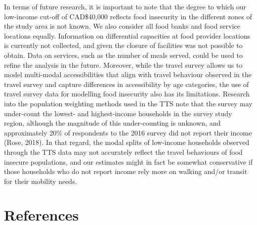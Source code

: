 \documentclass[]{elsarticle} %
\begin{document}
In terms of future research, it is important to note that the degree to
which our low-income cut-off of CAD\$40,000 reflects food insecurity in
the different zones of the study area is not known. We also consider all
food banks and food service locations equally. Information on
differential capacities at food provider locations is currently not
collected, and given the closure of facilities was not possible to
obtain. Data on services, such as the number of meals served, could be
used to refine the analysis in the future. Moreover, while the travel
survey allows us to model multi-modal accessibilities that align with
travel behaviour observed in the travel survey and capture differences
in accessibility by age categories, the use of travel survey data for
modelling food insecurity also has its limitations. Research into the
population weighting methods used in the TTS note that the survey may
under-count the lowest- and highest-income households in the survey
study region, although the magnitude of this under-counting is unknown,
and approximately 20\% of respondents to the 2016 survey did not report
their income (Rose, 2018). In that regard, the modal splits of
low-income households observed through the TTS data may not accurately
reflect the travel behaviours of food insecure populations, and our
estimates might in fact be somewhat conservative if those households who
do not report income rely more on walking and/or transit for their
mobility needs.

\hypertarget{references}{%
\section*{References}\label{references}}
\end{document}
